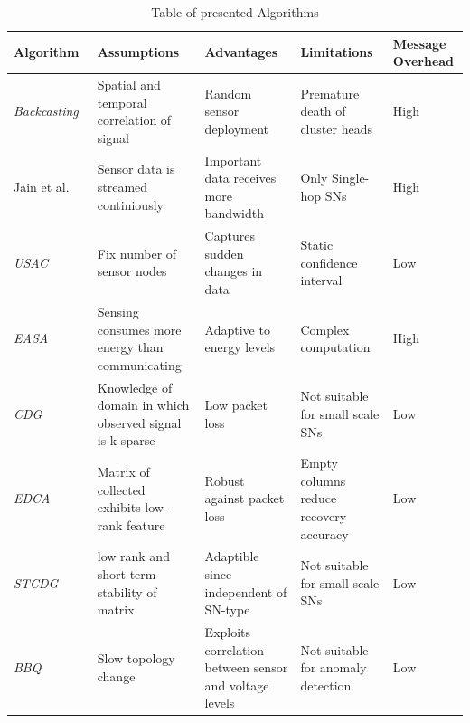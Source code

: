 \begin{table}[h]
\caption{Table of presented Algorithms \label{table:algorithm table}}

        \begin{tabular} { |p{3.5cm}||p{3cm}|p{3cm}|p{3cm}|p{2.5cm}| }

        \hline
        Algorithm & Assumptions & Advantages & Limitations & Message Overhead\\
        \hline

        \textit{Backcasting}~\cite{willett2004backcasting} & Spatial and temporal
        correlation of signal & Random sensor deployment & Premature death of
        cluster heads & High\\

        Jain et al.~\cite{jain2004adaptive} & Sensor data is streamed
        continiously & Important data receives more bandwidth & Only Single-hop
        \acp{SN} & High\\

        \textit{USAC}~\cite{padhy2006utility}& Fix number of sensor nodes &
        Captures sudden changes in data & Static confidence
        interval~\cite{kho2007decentralised} & Low\\

        \textit{EASA}~\cite{srbinovski2016energy}& Sensing consumes more energy
        than communicating & Adaptive to energy levels & Complex computation &
        High\\

        \textit{CDG}~\cite{luo2009compressive}& Knowledge of domain in which
        observed signal is k-sparse & Low packet loss & Not suitable for small
        scale \acp{SN} & Low\\

        \textit{EDCA}~\cite{cheng2010efficient}& Matrix of collected exhibits
        low-rank feature & Robust against packet loss & Empty columns reduce
        recovery accuracy~\cite{cheng2013stcdg} & Low\\

        \textit{STCDG}~\cite{cheng2013stcdg}& low rank and short term stability of
        matrix & Adaptible since independent of \ac{SN}-type & Not suitable for
        small scale \acp{SN}~\cite{yi2015partial} & Low\\

        \textit{BBQ}~\cite{deshpande2004model}& Slow topology change & Exploits
        correlation between sensor and voltage levels & Not suitable for
        anomaly detection & Low\\


\end{tabular}
\end{table}
